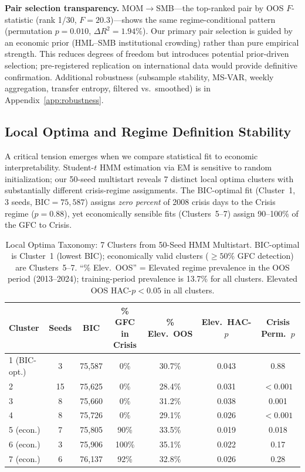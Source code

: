 \documentclass[sigconf,anonymous]{acmart}
\begin{document}
\textbf{Pair selection transparency.}
MOM$\to$SMB---the top-ranked pair by OOS $F$-statistic (rank 1/30,
$F = 20.3$)---shows the same regime-conditional pattern (permutation
$p = 0.010$, $\Delta R^2 = 1.94\%$). Our primary pair selection is guided
by an economic prior (HML--SMB institutional crowding) rather than pure
empirical strength. This reduces degrees of freedom but introduces potential
prior-driven selection; pre-registered replication on international data would
provide definitive confirmation.
Additional robustness (subsample stability, MS-VAR, weekly aggregation,
transfer entropy, filtered vs.\ smoothed) is in Appendix~\ref{app:robustness}.


\subsection{Local Optima and Regime Definition Stability}
\label{sec:local_optima}

A critical tension emerges when we compare statistical fit to economic interpretability.
Student-$t$ HMM estimation via EM is sensitive to random initialization; our 50-seed multistart
reveals 7 distinct local optima clusters with substantially different crisis-regime assignments.
The BIC-optimal fit (Cluster~1, 3 seeds, BIC$=75{,}587$) assigns \emph{zero percent} of 2008
crisis days to the Crisis regime ($p = 0.88$), yet economically sensible fits (Clusters~5--7)
assign 90--100\% of the GFC to Crisis.

\begin{table}[t]
\centering
\caption{Local Optima Taxonomy: 7 Clusters from 50-Seed HMM Multistart.
BIC-optimal is Cluster~1 (lowest BIC); economically valid clusters ($\geq 50\%$ GFC detection)
are Clusters~5--7. ``\% Elev.\ OOS'' = Elevated regime prevalence in the OOS period (2013--2024);
training-period prevalence is 13.7\% for all clusters. Elevated OOS HAC-$p < 0.05$ in all clusters.}
\label{tab:local_optima}
\scriptsize
\begin{tabular}{@{}lcccccc@{}}
\toprule
Cluster & Seeds & BIC & \% GFC in Crisis & \% Elev.\ OOS & Elev.\ HAC-$p$ & Crisis Perm.\ $p$ \\
\midrule
1 (BIC-opt.) & 3 & 75{,}587 & 0\% & 30.7\% & 0.043 & 0.88 \\
2 & 15 & 75{,}625 & 0\% & 28.4\% & 0.031 & $< 0.001$ \\
3 & 8 & 75{,}660 & 0\% & 31.2\% & 0.038 & 0.001 \\
4 & 8 & 75{,}726 & 0\% & 29.1\% & 0.026 & $< 0.001$ \\
5 (econ.) & 7 & 75{,}805 & 90\% & 33.5\% & 0.019 & 0.018 \\
6 (econ.) & 3 & 75{,}906 & 100\% & 35.1\% & 0.022 & 0.17 \\
7 (econ.) & 6 & 76{,}137 & 92\% & 32.8\% & 0.026 & 0.28 \\
\bottomrule
\end{tabular}
\end{table}
\end{document}
